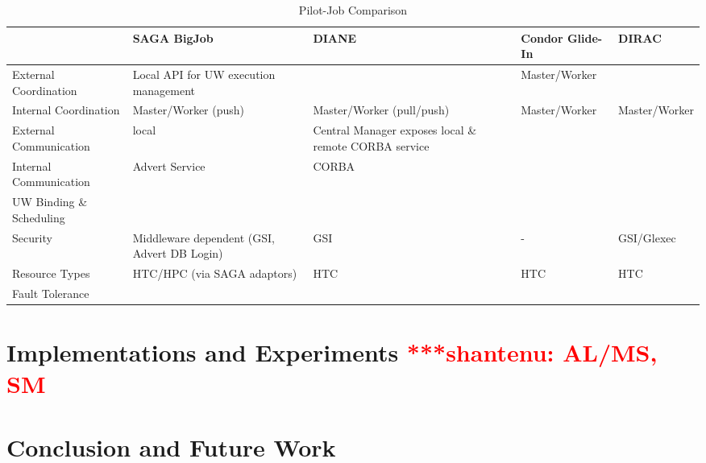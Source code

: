 \documentclass[conference,final]{IEEEtran}
\newcommand{\jhanote}[1]{ {\textcolor{red} { ***shantenu: #1 }}}
\newcommand{\jhanote}[1]{}
\begin{document}
\begin{table}[t]
\centering
\begin{tabular}{|l|p{2.5cm}|p{2.5cm}|p{2.5cm}|p{2.5cm}|}
	\hline
	&\textbf{SAGA BigJob} &\textbf{DIANE} &\textbf{Condor Glide-In} &   
	\textbf{DIRAC} \\ \hline
External Coordination &Local API for UW execution management & &Master/Worker &\\ \hline

Internal Coordination &Master/Worker (push) &Master/Worker (pull/push) &Master/Worker &Master/Worker\\ \hline

External Communication &local &Central Manager exposes local \& remote CORBA service & &\\ \hline
	
Internal Communication &Advert Service &CORBA & & \\ \hline

UW Binding \& Scheduling &&&&\\ \hline

Security &Middleware dependent (GSI, Advert DB Login) &GSI &- &GSI/Glexec\\ \hline

Resource Types &HTC/HPC (via SAGA adaptors) &HTC &HTC &HTC \\ \hline

Fault Tolerance  &&&&\\ \hline
	
\end{tabular}
\caption{Pilot-Job Comparison}
\end{table}

\section{Implementations and Experiments \jhanote{AL/MS, SM}}


\section{Conclusion and Future Work}





\end{document}
